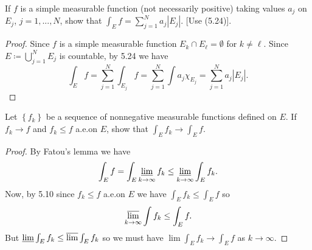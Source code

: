 \begin{problem}
If $f$ is a simple measurable function (not necessarily positive) taking
values $a_j$ on $E_j$, $j=1,...,N$, show that $\int_E f=\sum_{j=1}^N
a_j\left|E_j\right|$. [Use (5.24)].
\end{problem}
\begin{proof}
Since $f$ is a simple measurable function $E_k\cap E_\ell=\emptyset$ for
$k\neq\ell$. Since $E\coloneqq\bigcup_{j=1}^N E_j$ is countable, by 5.24 we
have
\[
\int_E f=\sum_{j=1}^N\int_{E_j} f=\sum_{j=1}^N\int a_j\chi_{E_j}=\sum_{j=1}^N a_j|E_j|.
\]
\end{proof}
\newpage

\begin{problem}
Let $\left\{f_k\right\}$ be a sequence of nonnegative measurable functions
defined on $E$. If $f_k\to f$ and $f_k\leq f$ a.e.\@ on $E$, show that
$\int_E f_k\to\int_E f$.
\end{problem}
\begin{proof}
By Fatou's lemma we have
\begin{equation}
  \label{eq:fatou-lower-bound}
\int_E f=\int_E\varliminf_{k\to\infty} f_k\leq\varliminf_{k\to\infty}\int_E f_k.
\end{equation}
Now, by 5.10 since $f_k\leq f$ a.e.\@ on $E$ we have $\int_E
f_k\leq\int_E f$ so
\begin{equation}
  \label{eq:upper-bound}
\varlimsup_{k\to\infty}\int f_k\leq\int_E f.
\end{equation}
But $\varliminf\int_E f_k\leq\varlimsup\int_E f_k$ so we must have
$\lim\int_E f_k\to\int_E f$ as $k\to\infty$.
\end{proof}

